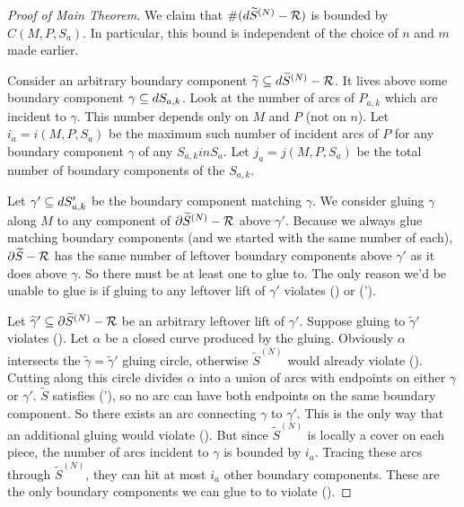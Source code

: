 \begin{proof}[Proof of Main Theorem]

We claim that $\#(d\widetilde{S}^{(N)} - \mathcal{R})$ is bounded by $C(M,P,S_a)$.  In
particular, this bound is independent of the choice of $n$ and $m$ made
earlier.


Consider an arbitrary boundary component $\widetilde{\gamma} \subseteq
d\widetilde{S}^{(N)} - \mathcal{R}$.  It lives above some boundary component $\gamma
\subseteq dS_{a,k}$. Look at the number of arcs of $P_{a,k}$ which are incident to
$\gamma$. This number depends only on $M$ and $P$ (not on $n$). Let $i_a
= i(M,P,S_a)$ be the maximum such number of incident arcs of $P$ for any
boundary component $\gamma$ of any $S_{a,k} in S_a$. Let $j_a = j(M,P,S_a)$ be
the total number of boundary components of the $S_{a,k}$.

Let $\gamma' \subseteq dS_{a,k}'$ be the boundary component matching $\gamma$. We
consider gluing $\gamma$ along $M$ to any component of $\partial\widetilde{S}^{(N)}
- \mathcal{R}$ above $\gamma'$.  Because we always glue matching boundary components
(and we started with the same number of each), $\partial\widetilde{S} - \mathcal{R}$ has the
same number of leftover boundary components above $\gamma'$ as it does above
$\gamma$. So there must be at least one to glue to.  The only reason we'd be
unable to glue is if gluing to any leftover lift of $\gamma'$ violates (\dag) or
(\dag').

Let $\widetilde{\gamma}' \subseteq \partial\widetilde{S}^{(N)} - \mathcal{R}$ be an arbitrary
leftover lift of $\gamma'$.  Suppose gluing to $\widetilde{\gamma}'$ violates
(\dag). Let $\alpha$ be a closed curve produced by the gluing.  Obviously
$\alpha$ intersects the $\widetilde{\gamma} = \widetilde{\gamma}'$ gluing
circle, otherwise $\widetilde{S}^{(N)}$ would already violate (\dag).  Cutting
along this circle divides $\alpha$ into a union of arcs with endpoints on
either $\gamma$ or $\gamma'$.  $\widetilde{S}$ satisfies (\dag'), so no arc can
have both endpoints on the same boundary component. So there exists an arc
connecting $\gamma$ to $\gamma'$. This is the only way that an additional
gluing would violate (\dag). But since $\widetilde{S}^{(N)}$ is locally a cover
on each piece, the number of arcs incident to $\gamma$ is bounded by $i_a$.
Tracing these arcs through $\widetilde{S}^{(N)}$, they can hit at most $i_a$
other boundary components.  These are the only boundary components we can glue
to to violate (\dag).


\end{proof}
